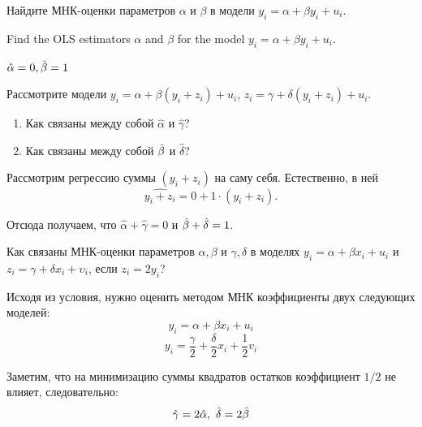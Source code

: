 \begin{problem}
\begin{translationru}
    Найдите МНК-оценки параметров $\alpha$ и $\beta$ в модели $y_i = \alpha + \beta y_i + u_i$.    
\end{translationru}
\begin{translationen}
    Find the OLS estimators $\alpha$ and $\beta$ for the model $y_i = \alpha + \beta y_i + u_i$.    
\end{translationen}

\begin{sol}
$\hat{\alpha} = 0,  \hat{\beta} = 1$
\end{sol}
\end{problem}


\begin{problem}
Рассмотрите модели $y_i = \alpha + \beta (y_i + z_i) + u_i$, $z_i = \gamma + \delta(y_i+z_i) + u_i$.
\begin{enumerate}
\item Как связаны между собой $\hat{\alpha}$ и $\hat{\gamma}$?
\item Как связаны между собой $\hat{\beta}$ и $\hat{\delta}$?
\end{enumerate}


\begin{sol} %
Рассмотрим регрессию суммы $(y_i + z_i)$ на саму себя. Естественно, в ней
\[
\widehat{y_i + z_i} = 0 + 1 \cdot (y_i + z_i).
\]

Отсюда получаем, что $\hat{\alpha} + \hat{\gamma} = 0$ и $\hat{\beta} + \hat{\delta} = 1$.
\end{sol}
\end{problem}




\begin{problem}
Как связаны МНК-оценки параметров $\alpha, \beta$ и $\gamma, \delta$ в моделях $y_i = \alpha + \beta x_i + u_i$ и $z_i = \gamma + \delta x_i + \upsilon_i$, если $z_i = 2 y_i$?


\begin{sol}

Исходя из условия, нужно оценить методом МНК коэффициенты двух следующих моделей:
\[y_i = \alpha + \beta x_i + u_i \]
\[y_i = \frac{\gamma}{2} + \frac{\delta}{2} x_i + \frac{1}{2} v_i \]

Заметим, что на минимизацию суммы квадратов остатков коэффициент \(1/2\) не влияет, следовательно:
\[\hat{\gamma} = 2\hat{\alpha}, \ \hat{\delta} = 2 \hat{\beta}  \]

\end{sol}
\end{problem}


